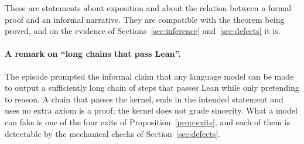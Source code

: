 These are statements about exposition and about the relation between a formal proof and an informal narrative. They are compatible with the theorem being proved, and on the evidence of Sections~\ref{sec:inference} and~\ref{sec:defects} it is.

\paragraph{A remark on ``long chains that pass Lean''.}
The episode prompted the informal claim that any language model can be made to output a sufficiently long chain of steps that passes Lean while only pretending to reason.
A chain that passes the kernel, ends in the intended statement and uses no extra axiom is a proof; the kernel does not grade sincerity.
What a model can fake is one of the four exits of Proposition~\ref{prop:exits}, and each of them is detectable by the mechanical checks of Section~\ref{sec:defects}.
